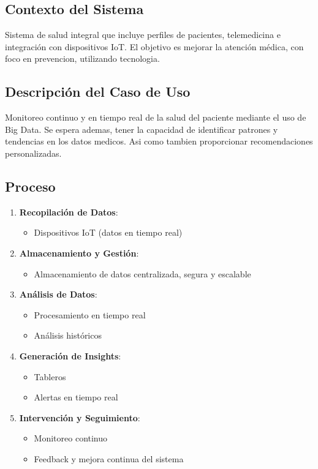 \subsection{Contexto del Sistema}
Sistema de salud integral que incluye perfiles de pacientes, telemedicina e integración con dispositivos IoT. El objetivo es mejorar la atención médica, con foco en prevencion, utilizando tecnologia.

\subsection{Descripción del Caso de Uso}
Monitoreo continuo y en tiempo real de la salud del paciente mediante el uso de Big Data. Se espera ademas, tener la capacidad de identificar patrones y tendencias en los datos medicos. Asi como tambien proporcionar recomendaciones personalizadas.

\subsection{Proceso}
\begin{enumerate}
    \item \textbf{Recopilación de Datos}:
    \begin{itemize}
        \item Dispositivos IoT (datos en tiempo real)
    \end{itemize}
    
    \item \textbf{Almacenamiento y Gestión}:
    \begin{itemize}
        \item Almacenamiento de datos centralizada, segura y escalable
    \end{itemize}
    
    \item \textbf{Análisis de Datos}:
    \begin{itemize}
        \item Procesamiento en tiempo real
        \item Análisis históricos
    \end{itemize}
    
    \item \textbf{Generación de Insights}:
    \begin{itemize}
        \item Tableros
        \item Alertas en tiempo real
    \end{itemize}
    
    \item \textbf{Intervención y Seguimiento}:
    \begin{itemize}
        \item Monitoreo continuo
        \item Feedback y mejora continua del sistema
    \end{itemize}
\end{enumerate}